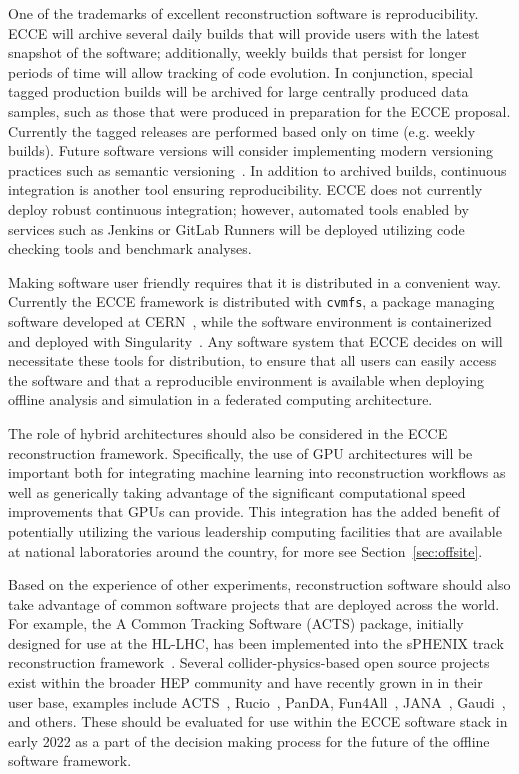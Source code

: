 One of the trademarks of excellent reconstruction software is reproducibility. ECCE will archive several daily builds that will provide users with the latest snapshot of the software; additionally, weekly builds that persist for longer periods of time will allow tracking of code evolution. In conjunction, special tagged production builds will be archived for large centrally produced data samples, such as those that were produced in preparation for the ECCE proposal. Currently the tagged releases are performed based only on time (e.g. weekly builds). Future software versions will consider implementing modern versioning practices such as semantic versioning~\cite{semantic}. In addition to archived builds, continuous integration is another tool ensuring reproducibility. ECCE does not currently deploy robust continuous integration; however, automated tools enabled by services such as Jenkins or GitLab Runners will be deployed utilizing code checking tools and benchmark analyses. 

Making software user friendly requires that it is distributed in a convenient way. Currently the ECCE framework is distributed with \texttt{cvmfs}, a package managing software developed at CERN~\cite{cernvm}, while the software environment is containerized and deployed with Singularity~\cite{singularity}. Any software system that ECCE decides on will necessitate these tools for distribution, to ensure that all users can easily access the software and that a reproducible environment is available when deploying offline analysis and simulation in a federated computing architecture.

The role of hybrid architectures should also be considered in the ECCE reconstruction framework. Specifically, the use of GPU architectures will be important both for integrating machine learning into reconstruction workflows as well as generically taking advantage of the significant computational speed improvements that GPUs can provide. This integration has the added benefit of potentially utilizing the various leadership computing facilities that are available at national laboratories around the country, for more see Section~\ref{sec:offsite}.


Based on the experience of other experiments, reconstruction software should also take advantage of common software projects that are deployed across the world. For example, the A Common Tracking Software (ACTS) package, initially designed for use at the HL-LHC, has been implemented into the sPHENIX track reconstruction framework~\cite{Osborn:2021zlr}. Several collider-physics-based open source projects exist within the broader HEP community and have recently grown in in their user base, examples include ACTS~\cite{Ai:2021ghi}, Rucio~\cite{Barisits:2019fyl}, PanDA, Fun4All~\cite{fun4allGithub}, JANA~\cite{jana2_chep19}, Gaudi~\cite{Gaudi}, and others. These should be evaluated for use within the ECCE software stack in early 2022 as a part of the decision making process for the future of the offline software framework.

